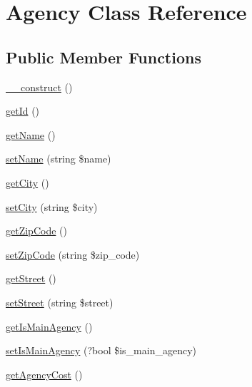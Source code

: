 \hypertarget{class_app_1_1_entity_1_1_agency}{}\section{Agency Class Reference}
\label{class_app_1_1_entity_1_1_agency}
\subsection*{Public Member Functions}
\begin{DoxyCompactItemize}
\item 
\mbox{\hyperlink{class_app_1_1_entity_1_1_agency_a095c5d389db211932136b53f25f39685}{\+\_\+\+\_\+construct}} ()
\item 
\mbox{\hyperlink{class_app_1_1_entity_1_1_agency_a12251d0c022e9e21c137a105ff683f13}{get\+Id}} ()
\item 
\mbox{\hyperlink{class_app_1_1_entity_1_1_agency_a3d0963e68bb313b163a73f2803c64600}{get\+Name}} ()
\item 
\mbox{\hyperlink{class_app_1_1_entity_1_1_agency_a392752b62c4f6aacea5c269690921ef3}{set\+Name}} (string \$name)
\item 
\mbox{\hyperlink{class_app_1_1_entity_1_1_agency_ae9ca906fce6e9fe5fab3a6b42209d6a1}{get\+City}} ()
\item 
\mbox{\hyperlink{class_app_1_1_entity_1_1_agency_af5d7dc38965353521a771e7ea053d2ef}{set\+City}} (string \$city)
\item 
\mbox{\hyperlink{class_app_1_1_entity_1_1_agency_a57a82c7e2cc6a5009844b8a9a9995e93}{get\+Zip\+Code}} ()
\item 
\mbox{\hyperlink{class_app_1_1_entity_1_1_agency_a38974ca863b9f65abf0d5cf642688eb0}{set\+Zip\+Code}} (string \$zip\+\_\+code)
\item 
\mbox{\hyperlink{class_app_1_1_entity_1_1_agency_ad804bd3a7447b83b37d6de35f2056fb2}{get\+Street}} ()
\item 
\mbox{\hyperlink{class_app_1_1_entity_1_1_agency_a1e2c497b60c59cc6e466d366ced3a61e}{set\+Street}} (string \$street)
\item 
\mbox{\hyperlink{class_app_1_1_entity_1_1_agency_abcc8847cd0fcbcf0fd4b4dd1d3e19c8a}{get\+Is\+Main\+Agency}} ()
\item 
\mbox{\hyperlink{class_app_1_1_entity_1_1_agency_a42f4c1e41051c02c6f3b3b56eebef37c}{set\+Is\+Main\+Agency}} (?bool \$is\+\_\+main\+\_\+agency)
\item 
\mbox{\hyperlink{class_app_1_1_entity_1_1_agency_a79021d0e11699c138811e3f07ec85cf9}{get\+Agency\+Cost}} ()

\end{DoxyCompactItemize}
